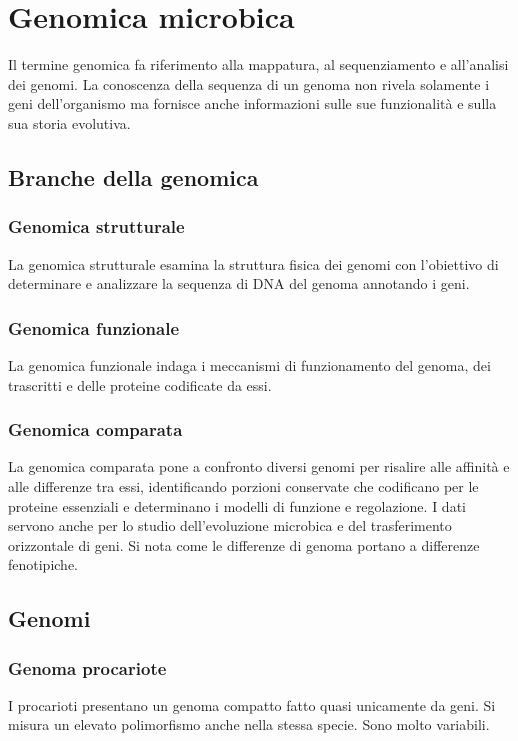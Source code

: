 \chapter{Genomica microbica}
Il termine genomica fa riferimento alla mappatura, al sequenziamento e all'analisi dei genomi. 
La conoscenza della sequenza di un genoma non rivela solamente i geni dell'organismo ma fornisce anche informazioni sulle sue funzionalit\`a e sulla sua storia evolutiva. 

\section{Branche della genomica}
	
	\subsection{Genomica strutturale}
	La genomica strutturale esamina la struttura fisica dei genomi con l'obiettivo di determinare e analizzare la sequenza di DNA del genoma annotando i geni.

	\subsection{Genomica funzionale}
	La genomica funzionale indaga i meccanismi di funzionamento del genoma, dei trascritti e delle proteine codificate da essi.

	\subsection{Genomica comparata}
	La genomica comparata pone a confronto diversi genomi per risalire alle affinit\`a e alle differenze tra essi, identificando porzioni conservate che codificano per le proteine essenziali e determinano i modelli di funzione e regolazione.
	I dati servono anche per lo studio dell'evoluzione microbica e del trasferimento orizzontale di geni.
	Si nota come le differenze di genoma portano a differenze fenotipiche.

\section{Genomi}

	\subsection{Genoma procariote}
	I procarioti presentano un genoma compatto fatto quasi unicamente da geni.
	Si misura un elevato polimorfismo anche nella stessa specie.
	Sono molto variabili.

